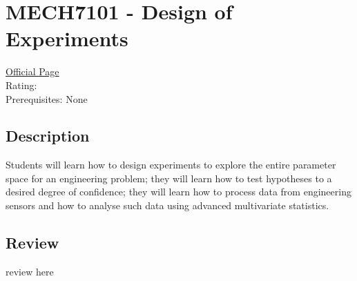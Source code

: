 \hypertarget{MECH7101}{\section{MECH7101 - Design of Experiments}}

\large
\textcolor{turbo_purple}{\href{https://my.uq.edu.au/programs-courses/course.html?course_code=MECH7101}{Official Page}} \\
Rating: \cstar\cstar\cstar\cstar\ostar \\
Prerequisites: None

\normalsize
\subsection*{Description}
Students will learn how to design experiments to explore the entire parameter space for an engineering problem; they will learn how to test hypotheses to a desired degree of confidence; they will learn how to process data from engineering sensors and how to analyse such data using advanced multivariate statistics.

\subsection*{Review}
review here
